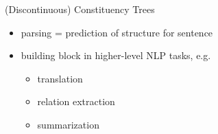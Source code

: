 \documentclass[aspectratio=169, 10pt]{beamer}
\begin{document}
\begin{frame}[label=working]{(Discontinuous) Constituency Trees}
\begin{minipage}{.58\linewidth}
\begin{itemize}
{\begin{tabular}{llc}
                    \bottomrule
                \end{tabular}}
                \item<+-> parsing = prediction of structure for sentence
                \item<+-> building block in higher-level NLP tasks, e.g.\@
                \begin{itemize}
                    \item translation \citep{Zhang19, Yang22}
                    \item relation extraction \citep{Nguyen19}
                    \item summarization \citep{Balachandran21}
                \end{itemize}
            \end{itemize}
        \end{minipage}
    \end{frame}
\end{document}
